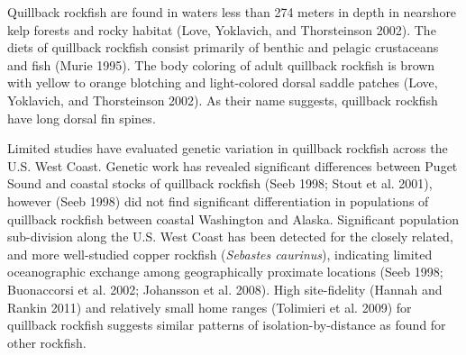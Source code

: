 \documentclass[11pt,
  english,
  a4paper,
]{article}
\begin{document}
\leavevmode\tagmcend\tagstructend\par


Quillback rockfish are found in waters less than 274 meters in depth in nearshore kelp forests and rocky habitat {(Love, Yoklavich, and Thorsteinson 2002)\leavevmode\tagmcend\tagstructend}. The diets of quillback rockfish consist primarily of benthic and pelagic crustaceans and fish {(Murie 1995)\leavevmode\tagmcend\tagstructend}. The body coloring of adult quillback rockfish is brown with yellow to orange blotching and light-colored dorsal saddle patches {(Love, Yoklavich, and Thorsteinson 2002)\leavevmode\tagmcend\tagstructend}. As their name suggests, quillback rockfish have long dorsal fin spines.

\leavevmode\tagmcend\tagstructend\par


Limited studies have evaluated genetic variation in quillback rockfish across the U.S. West Coast. Genetic work has revealed significant differences between Puget Sound and coastal stocks of quillback rockfish {(Seeb 1998; Stout et al. 2001)\leavevmode\tagmcend\tagstructend}, however {(Seeb 1998)\leavevmode\tagmcend\tagstructend} did not find significant differentiation in populations of quillback rockfish between coastal Washington and Alaska. Significant population sub-division along the U.S. West Coast has been detected for the closely related, and more well-studied copper rockfish (\emph{Sebastes caurinus}), indicating limited oceanographic exchange among geographically proximate locations {(Seeb 1998; Buonaccorsi et al. 2002; Johansson et al. 2008)\leavevmode\tagmcend\tagstructend}. High site-fidelity {(Hannah and Rankin 2011)\leavevmode\tagmcend\tagstructend} and relatively small home ranges {(Tolimieri et al. 2009)\leavevmode\tagmcend\tagstructend} for quillback rockfish suggests similar patterns of isolation-by-distance as found for other rockfish.
\end{document}
